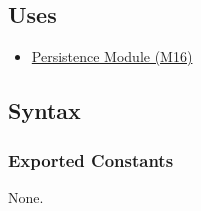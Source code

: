 \documentclass[12pt, titlepage]{article}
\begin{document}
\subsection{Uses}
\begin{itemize}
  \item \hyperref[mPersist]{Persistence Module (M16)}
\end{itemize}

\subsection{Syntax}

\subsubsection{Exported Constants}
None.
\end{document}
